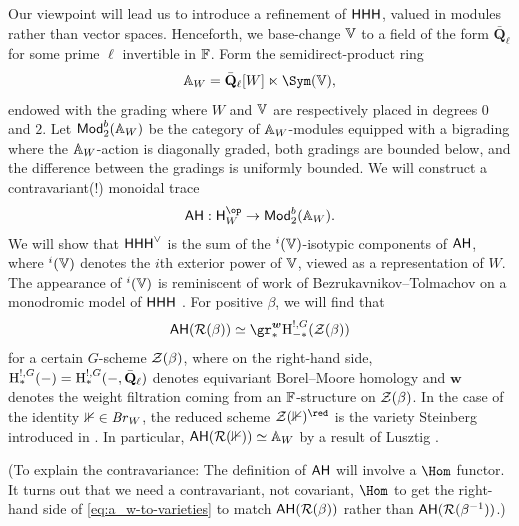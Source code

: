 \documentclass[a4paper,10pt,leqno]{amsart}
\theoremstyle{plain}
\theoremstyle{plain}
\theoremstyle{plain}
\theoremstyle{definition}
\theoremstyle{remark}
\let\Alt\relax
\DeclareMathOperator{\Alt}{\text{$\Lambda$}}
\newcommand{\Br}{\mathit{Br}}
\newcommand{\Mod}{\mathsf{Mod}}
\newcommand{\QL}{\bar{\mathbf{Q}}_\ell}
\begin{document}
Our viewpoint will lead us to introduce a refinement of $\sf{HHH}$, valued in modules rather than vector spaces.
Henceforth, we base-change $\bb{V}$ to a field of the form $\QL$ for some prime $\ell$ invertible in $\bb{F}$.
Form the semidirect-product ring
\begin{align}
\bb{A}_W = \QL[W] \ltimes \Sym(\bb{V}),
\end{align}
endowed with the grading where $W$ and $\bb{V}$ are respectively placed in degrees $0$ and $2$.
Let $\Mod_2^b(\bb{A}_W)$ be the category of $\bb{A}_W$-modules equipped with a bigrading where the $\bb{A}_W$-action is diagonally graded, both gradings are bounded below, and the difference between the gradings is uniformly bounded.
We will construct a contravariant(!) monoidal trace
\begin{align}
\sf{AH} : \sf{H}_W^\op \to \Mod_2^b(\bb{A}_W).
\end{align}
We will show that $\sf{HHH}^\vee$ is the sum of the $\Alt^i(\bb{V})$-isotypic components of $\sf{AH}$, where $\Alt^i(\bb{V})$ denotes the $i$th exterior power of $\bb{V}$, viewed as a representation of $W$.
The appearance of $\Alt^i(\bb{V})$ is reminiscent of work of Bezrukavnikov--Tolmachov on a monodromic model of $\sf{HHH}$ \cite{bt}.
For positive $\beta$, we will find that
\begin{align}\label{eq:a_w-to-varieties}
\sf{AH}(\cal{R}(\beta)) \simeq \gr_\ast^{\bm{w}} \ur{H}_{-\ast}^{!, G}(\cal{Z}(\beta))
\end{align}
for a certain $G$-scheme $\cal{Z}(\beta)$, where on the right-hand side, $\ur{H}_\ast^{!, G}(-) = \ur{H}_\ast^{!, G}(-, \QL)$ denotes equivariant Borel--Moore homology and $\bm{w}$ denotes the weight filtration coming from an $\bb{F}$-structure on $\cal{Z}(\beta)$.
In the case of the identity $\bb{1} \in \Br_W$, the reduced scheme $\cal{Z}(\bb{1})^\red$ is the variety Steinberg introduced in \cite{steinberg_1976}.
In particular, $\sf{AH}(\cal{R}(\bb{1})) \simeq \bb{A}_W$ by a result of Lusztig \cite{lusztig_1988}.

(To explain the contravariance:
The definition of $\sf{AH}$ will involve a $\Hom$ functor. 
It turns out that we need a contravariant, not covariant, $\Hom$ to get the right-hand side of \eqref{eq:a_w-to-varieties} to match $\sf{AH}(\cal{R}(\beta))$ rather than $\sf{AH}(\cal{R}(\beta^{-1}))$.)
\end{document}
